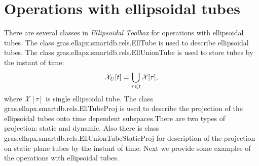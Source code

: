 \documentclass[letterpaper,10pt,english]{sphinxmanual}
\begin{document}
\section{Operations with ellipsoidal tubes}
\label{chap_implement:section-label}\label{chap_implement:operations-with-ellipsoidal-tubes}
There are several classes in \emph{Ellipsoidal Toolbox} for operations with
ellipsoidal tubes. The class gras.ellapx.smartdb.rels.EllTube is used to
describe ellipsoidal tubes. The class
gras.ellapx.smartdb.rels.EllUnionTube is used to store tubes by the
instant of time:
\label{chap_implement:union-label}\begin{gather}
\begin{split}{\mathcal X}_{U}[t]=\bigcup \limits_{\tau\leqslant t}{\mathcal X}[\tau],\end{split}\notag
\end{gather}
where \({\mathcal X}[\tau]\) is single ellipsoidal tube. The class
gras.ellapx.smartdb.rels.EllTubeProj is used to describe the projection
of the ellipsoidal tubes onto time dependent subspaces.There are two
types of projection: static and dynamic. Also there is class
gras.ellapx.smartdb.rels.EllUnionTubeStaticProj for description of the
projection on static plane tubes by the instant of time. Next we provide
some examples of the operations with ellipsoidal tubes.
\end{document}
